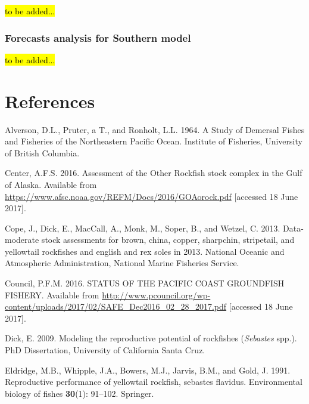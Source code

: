 \documentclass[12pt,]{article}
\begin{document}
\hl{to be added...}

\subsubsection{Forecasts analysis for Southern
model}\label{forecasts-analysis-for-southern-model}

\hl{to be added...}

\FloatBarrier

\newpage

\newpage

\color{black}

\section*{References}\label{references}

\renewcommand{\thepage}{}


\hypertarget{refs}{}
\hypertarget{ref-Alverson1964}{}
Alverson, D.L., Pruter, a T., and Ronholt, L.L. 1964. A Study of
Demersal Fishes and Fisheries of the Northeastern Pacific Ocean.
Institute of Fisheries, University of British Columbia.

\hypertarget{ref-AFSC2016}{}
Center, A.F.S. 2016. Assessment of the Other Rockfish stock complex in
the Gulf of Alaska. Available from
\url{https://www.afsc.noaa.gov/REFM/Docs/2016/GOAorock.pdf} {[}accessed
18 June 2017{]}.

\hypertarget{ref-Cope2013}{}
Cope, J., Dick, E., MacCall, A., Monk, M., Soper, B., and Wetzel, C.
2013. Data-moderate stock assessments for brown, china, copper,
sharpchin, stripetail, and yellowtail rockfishes and english and rex
soles in 2013. National Oceanic and Atmospheric Administration, National
Marine Fisheries Service.

\hypertarget{ref-PFMC2016}{}
Council, P.F.M. 2016. STATUS OF THE PACIFIC COAST GROUNDFISH FISHERY.
Available from
\url{http://www.pcouncil.org/wp-content/uploads/2017/02/SAFE_Dec2016_02_28_2017.pdf}
{[}accessed 18 June 2017{]}.

\hypertarget{ref-Dick2009}{}
Dick, E. 2009. Modeling the reproductive potential of rockfishes
(\emph{Sebastes} spp.). PhD Dissertation, University of California Santa
Cruz.

\hypertarget{ref-Eldridge1991}{}
Eldridge, M.B., Whipple, J.A., Bowers, M.J., Jarvis, B.M., and Gold, J.
1991. Reproductive performance of yellowtail rockfish, sebastes
flavidus. Environmental biology of fishes \textbf{30}(1): 91--102.
Springer.
\end{document}
